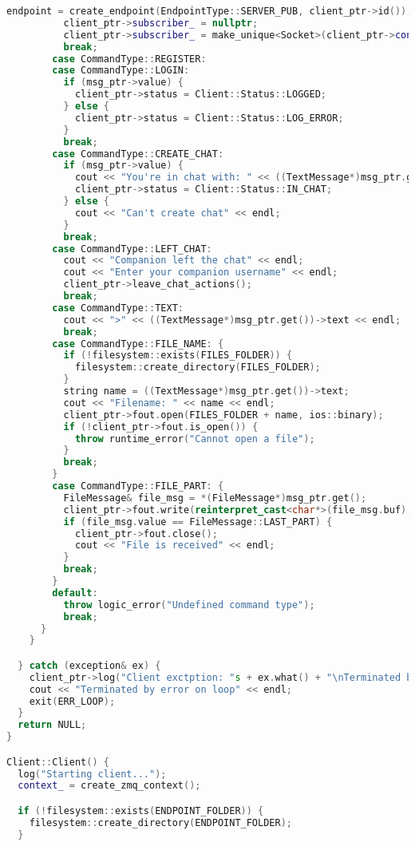 \begin{lstlisting}[language=C++]
          endpoint = create_endpoint(EndpointType::SERVER_PUB, client_ptr->id());
          client_ptr->subscriber_ = nullptr;
          client_ptr->subscriber_ = make_unique<Socket>(client_ptr->context_, SocketType::SUBSCRIBER, move(endpoint));
          break;
        case CommandType::REGISTER:
        case CommandType::LOGIN:
          if (msg_ptr->value) {
            client_ptr->status = Client::Status::LOGGED;
          } else {
            client_ptr->status = Client::Status::LOG_ERROR;
          }
          break;
        case CommandType::CREATE_CHAT:
          if (msg_ptr->value) {
            cout << "You're in chat with: " << ((TextMessage*)msg_ptr.get())->text << endl;
            client_ptr->status = Client::Status::IN_CHAT;
          } else {
            cout << "Can't create chat" << endl;
          }
          break;
        case CommandType::LEFT_CHAT:
          cout << "Companion left the chat" << endl;
          cout << "Enter your companion username" << endl;
          client_ptr->leave_chat_actions();
          break;
        case CommandType::TEXT:
          cout << ">" << ((TextMessage*)msg_ptr.get())->text << endl;
          break;
        case CommandType::FILE_NAME: {
          if (!filesystem::exists(FILES_FOLDER)) {
            filesystem::create_directory(FILES_FOLDER);
          }
          string name = ((TextMessage*)msg_ptr.get())->text;
          cout << "Filename: " << name << endl;
          client_ptr->fout.open(FILES_FOLDER + name, ios::binary);
          if (!client_ptr->fout.is_open()) {
            throw runtime_error("Cannot open a file");
          }
          break;
        }
        case CommandType::FILE_PART: {
          FileMessage& file_msg = *(FileMessage*)msg_ptr.get();
          client_ptr->fout.write(reinterpret_cast<char*>(file_msg.buf), file_msg.size);
          if (file_msg.value == FileMessage::LAST_PART) {
            client_ptr->fout.close();
            cout << "File is received" << endl;
          }
          break;
        }
        default:
          throw logic_error("Undefined command type");
          break;
      }
    }

  } catch (exception& ex) {
    client_ptr->log("Client exctption: "s + ex.what() + "\nTerminated by exception on client receive loop"s);
    cout << "Terminated by error on loop" << endl;
    exit(ERR_LOOP);
  }
  return NULL;
}

Client::Client() {
  log("Starting client...");
  context_ = create_zmq_context();

  if (!filesystem::exists(ENDPOINT_FOLDER)) {
    filesystem::create_directory(ENDPOINT_FOLDER);
  }


\end{lstlisting}
